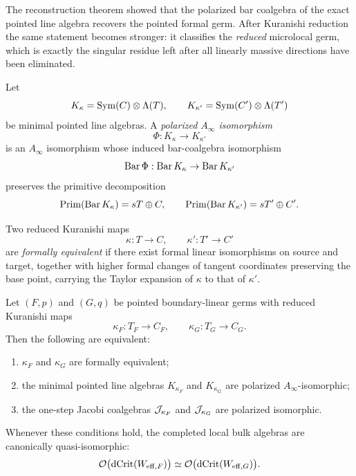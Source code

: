 The reconstruction theorem showed that the polarized bar coalgebra of the exact pointed line algebra recovers the pointed formal germ. After Kuranishi reduction the same statement becomes stronger: it classifies the \emph{reduced} microlocal germ, which is exactly the singular residue left after all linearly massive directions have been eliminated.

\begin{definition}
Let
\[
K_\kappa=\operatorname{Sym}(C)\otimes \Lambda(T),
\qquad
K_{\kappa'}=\operatorname{Sym}(C')\otimes \Lambda(T')
\]
be minimal pointed line algebras. A \emph{polarized $A_\infty$ isomorphism}
\[
\Phi:K_\kappa\longrightarrow K_{\kappa'}
\]
is an $A_\infty$ isomorphism whose induced bar-coalgebra isomorphism
\[
\operatorname{Bar} \Phi:\operatorname{Bar} K_\kappa\to \operatorname{Bar} K_{\kappa'}
\]
preserves the primitive decomposition
\[
\mathrm{Prim}(\operatorname{Bar} K_\kappa)=sT\oplus C,
\qquad
\mathrm{Prim}(\operatorname{Bar} K_{\kappa'})=sT'\oplus C'.
\]
\end{definition}

\begin{definition}
Two reduced Kuranishi maps
\[
\kappa:T\to C,
\qquad
\kappa':T'\to C'
\]
are \emph{formally equivalent} if there exist formal linear isomorphisms on source and target, together with higher formal changes of tangent coordinates preserving the base point, carrying the Taylor expansion of $\kappa$ to that of $\kappa'$.
\end{definition}

\begin{theorem}%
Let $(F,p)$ and $(G,q)$ be pointed boundary-linear germs with reduced Kuranishi maps
\[
\kappa_F:T_F\to C_F,
\qquad
\kappa_G:T_G\to C_G.
\]
Then the following are equivalent:
\begin{enumerate}[label=(\roman*),leftmargin=1.8em]
\item $\kappa_F$ and $\kappa_G$ are formally equivalent;
\item the minimal pointed line algebras $K_{\kappa_F}$ and $K_{\kappa_G}$ are polarized $A_\infty$-isomorphic;
\item the one-step Jacobi coalgebras $\mathcal J_{\kappa_F}$ and $\mathcal J_{\kappa_G}$ are polarized isomorphic.
\end{enumerate}
Whenever these conditions hold, the completed local bulk algebras are canonically quasi-isomorphic:
\[
\mathcal O\bigl(\operatorname{dCrit}(W_{\mathrm{eff},F})\bigr)\simeq \mathcal O\bigl(\operatorname{dCrit}(W_{\mathrm{eff},G})\bigr).
\]
\end{theorem}

